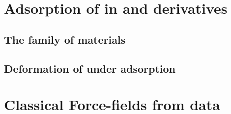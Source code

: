 \documentclass[thesis]{subfiles}
\begin{document}

\section{Adsorption of  in  and derivatives}

\subsection{The  family of materials}

\subsection{Deformation of  under adsorption}

\section{Classical Force-fields from \abinitio data}

\OnlyInSubfile{\printbibliography}
\end{document}

